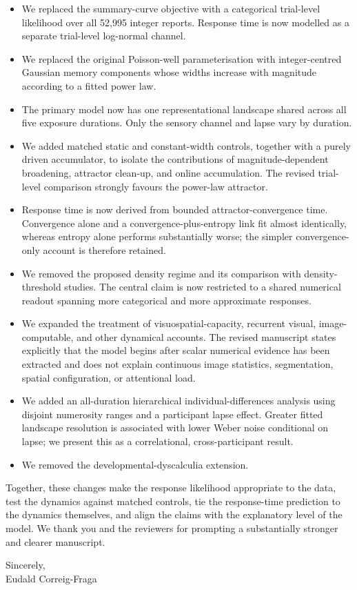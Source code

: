 \documentclass[11pt]{article}
\begin{document}
\begin{itemize}
\item We replaced the summary-curve objective with a categorical trial-level likelihood over all 52,995 integer reports. Response time is now modelled as a separate trial-level log-normal channel.

\item We replaced the original Poisson-well parameterisation with integer-centred Gaussian memory components whose widths increase with magnitude according to a fitted power law.

\item The primary model now has one representational landscape shared across all five exposure durations. Only the sensory channel and lapse vary by duration.

\item We added matched static and constant-width controls, together with a purely driven accumulator, to isolate the contributions of magnitude-dependent broadening, attractor clean-up, and online accumulation. The revised trial-level comparison strongly favours the power-law attractor.

\item Response time is now derived from bounded attractor-convergence time. Convergence alone and a convergence-plus-entropy link fit almost identically, whereas entropy alone performs substantially worse; the simpler convergence-only account is therefore retained.

\item We removed the proposed density regime and its comparison with density-threshold studies. The central claim is now restricted to a shared numerical readout spanning more categorical and more approximate responses.

\item We expanded the treatment of visuospatial-capacity, recurrent visual, image-computable, and other dynamical accounts. The revised manuscript states explicitly that the model begins after scalar numerical evidence has been extracted and does not explain continuous image statistics, segmentation, spatial configuration, or attentional load.

\item We added an all-duration hierarchical individual-differences analysis using disjoint numerosity ranges and a participant lapse effect. Greater fitted landscape resolution is associated with lower Weber noise conditional on lapse; we present this as a correlational, cross-participant result.

\item We removed the developmental-dyscalculia extension.
\end{itemize}

Together, these changes make the response likelihood appropriate to the data, test the dynamics against matched controls, tie the response-time prediction to the dynamics themselves, and align the claims with the explanatory level of the model. We thank you and the reviewers for prompting a substantially stronger and clearer manuscript.

Sincerely,\\
Eudald Correig-Fraga
\end{document}
